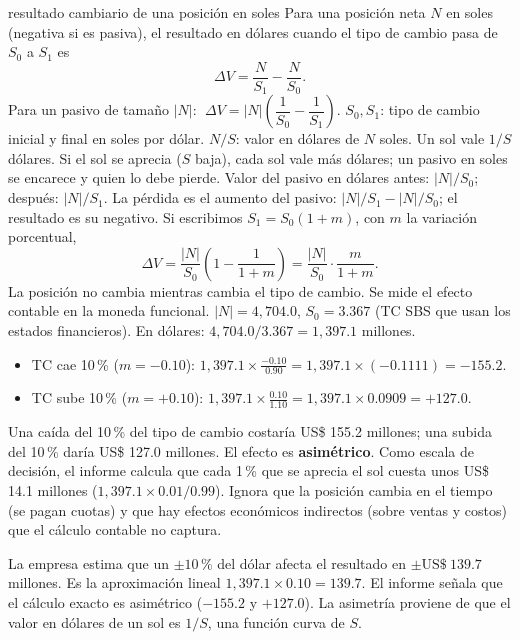 \begin{ficha}{resultado cambiario de una posición en soles}
 Para una posición neta $N$ en soles (negativa si es pasiva), el resultado en dólares cuando el tipo de cambio pasa de $S_0$ a $S_1$ es
\[ \Delta V=\frac{N}{S_1}-\frac{N}{S_0}. \]
Para un pasivo de tamaño $|N|$: $\;\Delta V=|N|\left(\dfrac{1}{S_0}-\dfrac{1}{S_1}\right)$.
 $S_0,S_1$: tipo de cambio inicial y final en soles por dólar. $N/S$: valor en dólares de $N$ soles.
 Un sol vale $1/S$ dólares. Si el sol se aprecia ($S$ baja), cada sol vale más dólares; un pasivo en soles se encarece y quien lo debe pierde.
 Valor del pasivo en dólares antes: $|N|/S_0$; después: $|N|/S_1$. La pérdida es el aumento del pasivo: $|N|/S_1-|N|/S_0$; el resultado es su negativo. Si escribimos $S_1=S_0(1+m)$, con $m$ la variación porcentual,
\[ \Delta V=\frac{|N|}{S_0}\left(1-\frac{1}{1+m}\right)=\frac{|N|}{S_0}\cdot\frac{m}{1+m}. \]
 La posición no cambia mientras cambia el tipo de cambio. Se mide el efecto contable en la moneda funcional.
 $|N|=4{,}704.0$, $S_0=3.367$ (TC SBS que usan los estados financieros). En dólares: $4{,}704.0/3.367=1{,}397.1$ millones.
\begin{itemize}
\item TC cae 10\,\% ($m=-0.10$): $1{,}397.1\times\frac{-0.10}{0.90}=1{,}397.1\times(-0.1111)=-155.2$.
\item TC sube 10\,\% ($m=+0.10$): $1{,}397.1\times\frac{0.10}{1.10}=1{,}397.1\times0.0909=+127.0$.
\end{itemize}
 Una caída del 10\,\% del tipo de cambio costaría US\$ 155.2 millones; una subida del 10\,\% daría US\$ 127.0 millones. El efecto es \textbf{asimétrico}. Como escala de decisión, el informe calcula que cada 1\,\% que se aprecia el sol cuesta unos US\$ 14.1 millones ($1{,}397.1\times0.01/0.99$).
 Ignora que la posición cambia en el tiempo (se pagan cuotas) y que hay efectos económicos indirectos (sobre ventas y costos) que el cálculo contable no captura.
\end{ficha}


\begin{informe}
La empresa estima que un $\pm10\,\%$ del dólar afecta el resultado en $\pm\text{US\$}~139.7$ millones. Es la aproximación lineal $1{,}397.1\times0.10=139.7$. El informe señala que el cálculo exacto es asimétrico ($-155.2$ y $+127.0$). La asimetría proviene de que el valor en dólares de un sol es $1/S$, una función curva de $S$.
\end{informe}

